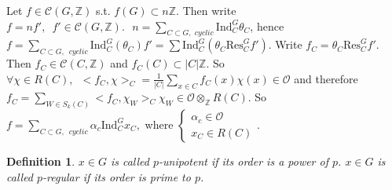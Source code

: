 \documentclass[12pt,letterpaper]{report}
\newtheorem{definition}{Definition}[section]
\begin{document}
Let $f\in \mathcal{C}(G,\mathbb{Z})$ s.t. $f(G)\subset n\mathbb{Z}$. Then write $f=nf',\,\,\,f'\in\mathcal{C}(G,\mathbb{Z}).\,\,\,\,n=\sum_{C\subset G,\,\,cyclic}\text{Ind}_{C}^{G}\theta_{C}$, hence $f=\sum_{C\subset G,\,\,\,cyclic}\text{Ind}_{C}^{G}(\theta_{C})f'=\sum\text{Ind}_{C}^{G}(\theta_{C}\text{Res}_{C}^{G}f')$. Write $f_{C}=\theta_{C}\text{Res}_{C}^{G}f'$. Then $f_{C}\in\mathcal{C}(C,\mathbb{Z})$ and $f_{C}(C)\subset|C|\mathbb{Z}$. So $\forall \chi\in R(C),\,\,\,<f_{C},\chi>_{C}=\frac{1}{|C|}\sum_{x\in C}f_{C}(x)\chi(x)\in\mathcal{O}$ and therefore $f_{C}=\sum_{W\in S_{k}(C)}<f_{C},\chi_{W}>_{C}\chi_{W}\in\mathcal{O}\otimes_{\mathbb{Z}}R(C)$. So $f=\sum_{C\subset G,\,\,\,cyclic}\alpha_{c}\text{Ind}_{C}^{G}x_{C},$ where $\left\{\begin{array}{r}\alpha_{c}\in\mathcal{O}\\x_{C}\in R(C)\end{array}\right.$. 
\begin{definition}$x\in G$ is called $p$-unipotent if its order is a power of $p$. $x\in G$ is called $p$-regular if its order is prime to $p$. \end{definition}
\end{document}
